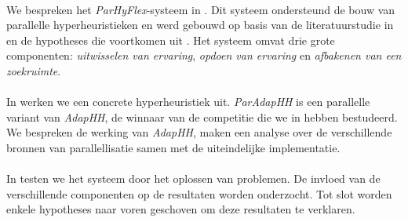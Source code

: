 \paragraph{}
We bespreken het \emph{ParHyFlex}-systeem in . Dit systeem ondersteund de bouw van parallelle hyperheuristieken en werd gebouwd op basis van de literatuurstudie in  en de hypotheses die voortkomen uit . Het systeem omvat drie grote componenten: \emph{uitwisselen van ervaring}, \emph{opdoen van ervaring} en \emph{afbakenen van een zoekruimte}.

\paragraph{}
In  werken we een concrete hyperheuristiek uit. \emph{ParAdapHH} is een parallelle variant van \emph{AdapHH}, de winnaar van de competitie die we in  hebben bestudeerd. We bespreken de werking van \emph{AdapHH}, maken een analyse over de verschillende bronnen van parallellisatie samen met de uiteindelijke implementatie.

\paragraph{}
In  testen we het systeem door het oplossen van  problemen. De invloed van de verschillende componenten op de resultaten worden onderzocht. Tot slot worden enkele hypotheses naar voren geschoven om deze resultaten te verklaren.




